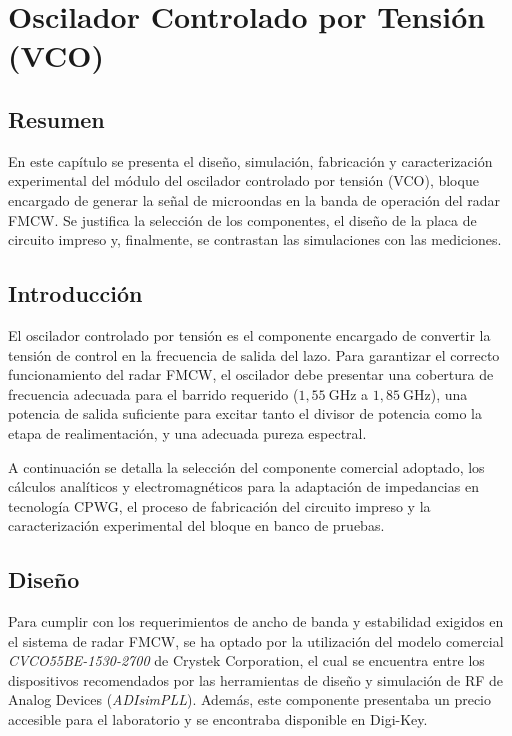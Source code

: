 \chapter{Oscilador Controlado por Tensión (VCO)}
\section*{Resumen}
En este capítulo se presenta el diseño, simulación, fabricación y caracterización experimental del módulo del oscilador controlado por tensión (VCO), bloque encargado de generar la señal de microondas en la banda de operación del radar FMCW. Se justifica la selección de los componentes, el diseño de la placa de circuito impreso y, finalmente, se contrastan las simulaciones con las mediciones.

\section{Introducción}
El oscilador controlado por tensión es el componente encargado de convertir la tensión de control en la frecuencia de salida del lazo. Para garantizar el correcto funcionamiento del radar FMCW, el oscilador debe presentar una cobertura de frecuencia adecuada para el barrido requerido ($1{,}55~\mathrm{GHz}$ a $1{,}85~\mathrm{GHz}$), una potencia de salida suficiente para excitar tanto el divisor de potencia como la etapa de realimentación, y una adecuada pureza espectral.

A continuación se detalla la selección del componente comercial adoptado, los cálculos analíticos y electromagnéticos para la adaptación de impedancias en tecnología CPWG, el proceso de fabricación del circuito impreso y la caracterización experimental del bloque en banco de pruebas.

\section{Diseño}

Para cumplir con los requerimientos de ancho de banda y estabilidad exigidos en el sistema de radar FMCW, se ha optado por la utilización del modelo comercial \textit{CVCO55BE-1530-2700} \cite{crystekVCO} de Crystek Corporation, el cual se encuentra entre los dispositivos recomendados por las herramientas de diseño y simulación de RF de Analog Devices (\textit{ADIsimPLL}). Además, este componente presentaba un precio accesible para el laboratorio y se encontraba disponible en Digi-Key.

